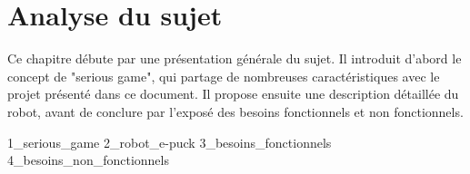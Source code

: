 \section{Analyse du sujet}

Ce chapitre débute par une présentation générale du sujet.
Il introduit d’abord le concept de "serious game", qui partage de nombreuses caractéristiques avec le projet présenté dans ce document.
Il propose ensuite une description détaillée du robot, avant de conclure par l’exposé des besoins fonctionnels et non fonctionnels.

{1_serious_game}
{2_robot_e-puck}
{3_besoins_fonctionnels}
{4_besoins_non_fonctionnels}
